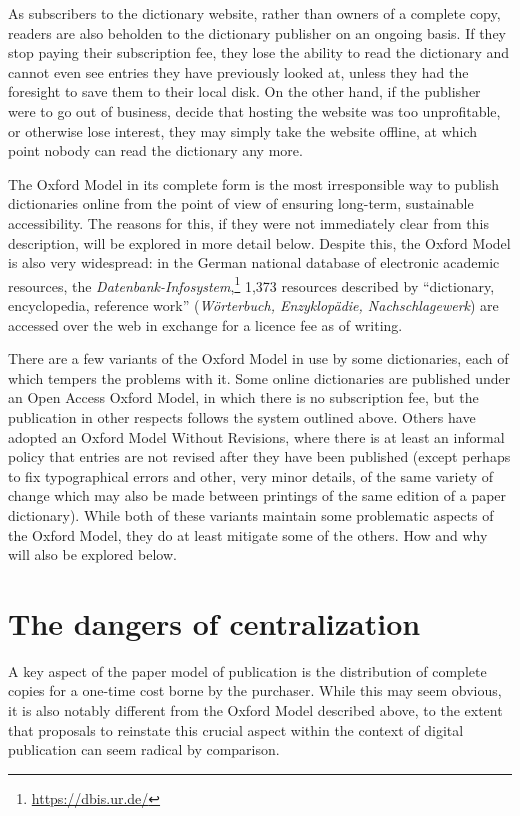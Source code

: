 \documentclass[output=paper]{langscibook}
\begin{document}
As subscribers to the dictionary website, rather than owners of a
complete copy, readers are also beholden to the dictionary publisher on
an ongoing basis. If they stop paying their subscription fee, they lose
the ability to read the dictionary and cannot even see entries they have
previously looked at, unless they had the foresight to save them to
their local disk. On the other hand, if the publisher were to go out of
business, decide that hosting the website was too unprofitable, or
otherwise lose interest, they may simply take the website offline, at
which point nobody can read the dictionary any more.

The Oxford Model in its complete form is the most irresponsible way to
publish dictionaries online from the point of view of ensuring
long-term, sustainable accessibility. The reasons for this, if they were
not immediately clear from this description, will be explored in more
detail below. Despite this, the Oxford Model is also very widespread: in
the German national database of electronic academic resources, the
\emph{Datenbank\hyp Infosystem},\footnote{\url{https://dbis.ur.de/}} 1,373 resources described by “dictionary,
encyclopedia, reference work” (\emph{Wörterbuch, Enzyklopädie,
Nachschlagewerk}) are accessed over the web in exchange for a licence
fee as of writing.

There are a few variants of the Oxford Model in use by some
dictionaries, each of which tempers the problems with it. Some online
dictionaries are published under an Open Access Oxford Model, in which
there is no subscription fee, but the publication in other respects
follows the system outlined above. Others have adopted an Oxford Model
Without Revisions, where there is at least an informal policy that
entries are not revised after they have been published (except perhaps
to fix typographical errors and other, very minor details, of the same
variety of change which may also be made between printings of the same
edition of a paper dictionary). While both of these variants maintain
some problematic aspects of the Oxford Model, they do at least mitigate
some of the others. How and why will also be explored below.

\section{The dangers of centralization}\label{the-dangers-of-centralization}

A key aspect of the paper model of publication is the distribution of
complete copies for a one-time cost borne by the purchaser. While this
may seem obvious, it is also notably different from the Oxford Model
described above, to the extent that proposals to reinstate this crucial
aspect within the context of digital publication can seem radical by
comparison.
\end{document}
